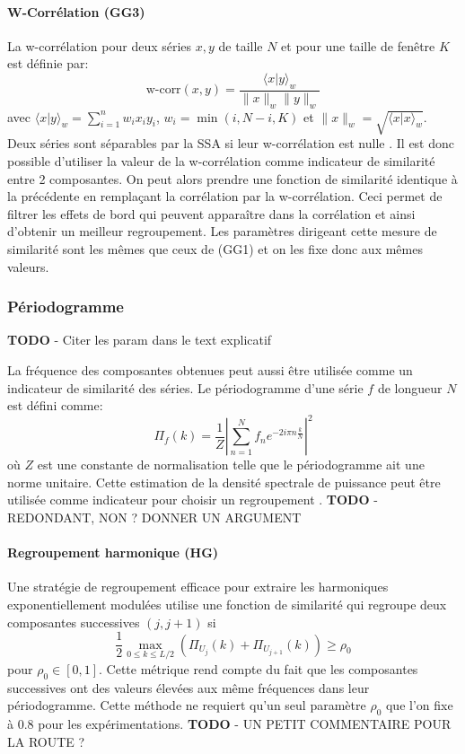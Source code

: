 \documentclass{gretsi}
\begin{document}
\paragraph{W-Corrélation (GG3)}\label{par:GG3} 
    La w-corrélation pour deux séries $x, y$ de taille $N$ et pour une taille de fenêtre $K$ est définie par:
    $$
    \text{w-corr}(x, y) = \frac{\langle x|y\rangle_w}{\|x\|_w\|y\|_w}
    $$avec $\langle x|y\rangle_w = \sum_{i=1}^n w_i x_i y_i$, $w_i = \min(i, N-i, K)$ et $\|x\|_w = \sqrt{\langle x|x\rangle_w}$. Deux séries sont séparables par la SSA si leur w-corrélation est nulle \cite{GNZ_10_SSA}. Il est donc possible d'utiliser la valeur de la w-corrélation comme indicateur de similarité entre 2 composantes. On peut alors prendre une fonction de similarité identique à la précédente en remplaçant la corrélation par la w-corrélation. Ceci permet de filtrer les effets de bord qui peuvent apparaître dans la corrélation et ainsi d'obtenir un meilleur regroupement. Les paramètres dirigeant cette mesure de similarité sont les mêmes que ceux de (GG1) et on les fixe donc aux mêmes valeurs.


\subsubsection{Périodogramme}\label{ssub:per}
{\color{red} \textbf{TODO} - Citer les param dans le text explicatif} 

La fréquence des composantes obtenues peut aussi être utilisée comme un indicateur de similarité des séries. Le périodogramme d'une série $f$ de longueur $N$ est défini comme:
$$
\Pi_f(k) = \frac{1}{Z}\left|\sum_{n=1}^N f_n e^{-2i\pi n \frac{k}{N}}\right|^2
$$où $Z$ est une constante de normalisation telle que le périodogramme ait une norme unitaire. Cette estimation de la densité spectrale de puissance peut être utilisée  comme indicateur pour choisir un regroupement \cite{GNZ_10_SSA}. %
{\color{red} \textbf{TODO} - REDONDANT, NON ? DONNER UN ARGUMENT}   

\paragraph{Regroupement harmonique (HG)}\label{par:HG}
    Une stratégie de regroupement efficace pour extraire les harmoniques exponentiellement modulées \cite{alexandrov_05_auto} utilise une fonction de similarité qui regroupe deux composantes successives $(j, j+1)$ si 
    $$
    \frac{1}{2}\max_{0\le k \le L/2}\left(\Pi_{U_j}(k) + \Pi_{U_{j+1}}(k)\right) \ge \rho_0 
    $$pour $\rho_0\in \left[0, 1\right]$. Cette métrique rend compte du fait que les composantes successives ont des valeurs élevées aux même fréquences dans leur périodogramme. Cette méthode ne requiert qu'un seul paramètre $\rho_0$ que l'on fixe à 0.8 pour les expérimentations. %
{\color{red} \textbf{TODO} - UN PETIT COMMENTAIRE POUR LA ROUTE ? }  
\end{document}
